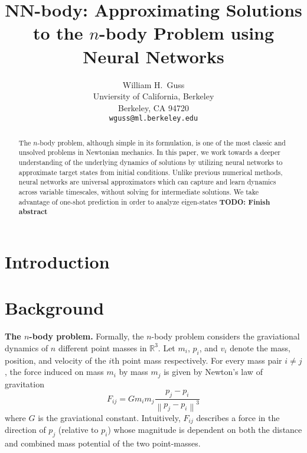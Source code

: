 \documentclass{article}
\title{NN-body: Approximating Solutions to the $n$-body Problem using Neural Networks}
\author{
  William H.~Guss \\
  Unviersity of California, Berkeley\\
  Berkeley, CA 94720 \\
  \texttt{wguss@ml.berkeley.edu} 
}
\numberwithin{theorem}{section}
\numberwithin{equation}{section}
\begin{document}

\maketitle

\begin{abstract} 
The $n$-body problem, although simple in its formulation, is one of the most classic and unsolved problems in Newtonian mechanics. In this paper, we work towards a deeper understanding of the underlying dynamics of solutions by utilizing neural networks to approximate target states from initial conditions. Unlike previous numerical methods, neural networks are universal approximators which can capture and learn dynamics across variable timescales, without solving for intermediate solutions. We take advantage of one-shot prediction in order to analyze eigen-states \textbf{TODO: Finish abstract}
\end{abstract} 
\section{Introduction}


\section{Background}


\textbf{The $n$-body problem. } Formally, the $n$-body problem considers the graviational dynamics of $n$ different point masses in $\mathbb{R}^3$. Let $m_i$, $p_i$, and $v_i$ denote the mass, position, and velocity of the $i$th point mass respectively. For every mass pair $i \neq j$, the force induced on mass $m_i$ by mass $m_j$ is given by Newton's law of gravitation
\begin{equation}\label{eq:forceindividual}
	F_{ij} = G m_i m_j \frac{p_j - p_i}{\left\|p_j - p_i\right\|^3}
\end{equation}
where $G$ is the graviational constant. Intuitively, $F_{ij}$ describes a force in the direction of $p_j$ (relative to $p_i$) whose magnitude is dependent on both the distance and combined mass potential of the two point-masses.
\end{document}
